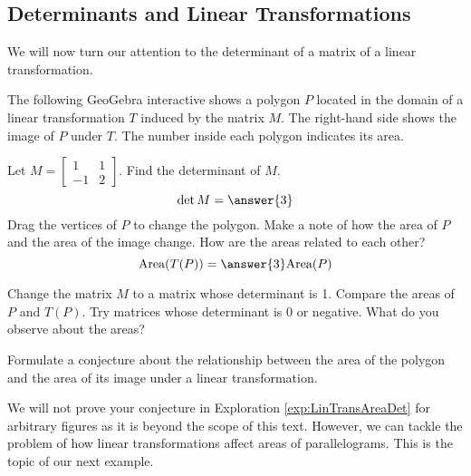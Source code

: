 \documentclass{ximera}
\begin{document}
\subsection*{Determinants and Linear Transformations}
We will now turn our attention to the determinant of a matrix of a linear transformation.  
\begin{exploration}\label{exp:LinTransAreaDet}
The following GeoGebra interactive shows a polygon $P$ located in the domain of a linear transformation $T$ induced by the matrix $M$.  The right-hand side shows the image of $P$ under $T$.  The number inside each polygon indicates its area.
\begin{center}
\end{center}
\begin{question}
Let $M=\begin{bmatrix}1&1\\-1&2\end{bmatrix}$.  Find the determinant of $M$.
$$\det{M}=\answer{3}$$
Drag the vertices of $P$ to change the polygon.  Make a note of how the area of $P$ and the area of the image change.  How are the areas related to each other?
$$\mbox{Area}(T(P))=\answer{3}\mbox{Area}(P)$$
\end{question}
\begin{question}
Change the matrix $M$ to a matrix whose determinant is 1.  Compare the areas of $P$ and $T(P)$.  Try matrices whose determinant is 0 or negative.  What do you observe about the areas?

Formulate a conjecture about the relationship between the area of the polygon and the area of its image under a linear transformation.
\end{question}
\end{exploration}
We will not prove your conjecture in Exploration \ref{exp:LinTransAreaDet} for arbitrary figures as it is beyond the scope of this text.  However, we can tackle the problem of how linear transformations affect areas of parallelograms.  This is the topic of our next example.
\end{document}

